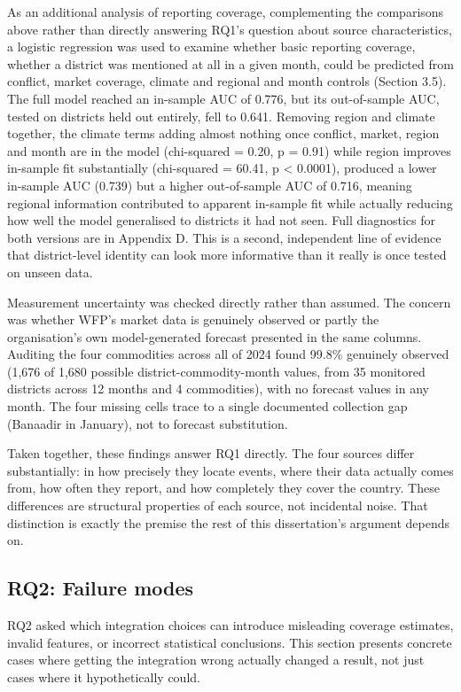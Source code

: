 \documentclass[12pt,a4paper]{article}
\begin{document}
As an additional analysis of reporting coverage, complementing the comparisons above rather than directly answering RQ1's question about source characteristics, a logistic regression was used to examine whether basic reporting coverage, whether a district was mentioned at all in a given month, could be predicted from conflict, market coverage, climate and regional and month controls (Section 3.5). The full model reached an in-sample AUC of 0.776, but its out-of-sample AUC, tested on districts held out entirely, fell to 0.641. Removing region and climate together, the climate terms adding almost nothing once conflict, market, region and month are in the model (chi-squared = 0.20, p = 0.91) while region improves in-sample fit substantially (chi-squared = 60.41, p < 0.0001), produced a lower in-sample AUC (0.739) but a higher out-of-sample AUC of 0.716, meaning regional information contributed to apparent in-sample fit while actually reducing how well the model generalised to districts it had not seen. Full diagnostics for both versions are in Appendix D. This is a second, independent line of evidence that district-level identity can look more informative than it really is once tested on unseen data.

Measurement uncertainty was checked directly rather than assumed. The concern was whether WFP's market data is genuinely observed or partly the organisation's own model-generated forecast presented in the same columns. Auditing the four commodities across all of 2024 found 99.8\% genuinely observed (1,676 of 1,680 possible district-commodity-month values, from 35 monitored districts across 12 months and 4 commodities), with no forecast values in any month. The four missing cells trace to a single documented collection gap (Banaadir in January), not to forecast substitution.

Taken together, these findings answer RQ1 directly. The four sources differ substantially: in how precisely they locate events, where their data actually comes from, how often they report, and how completely they cover the country. These differences are structural properties of each source, not incidental noise. That distinction is exactly the premise the rest of this dissertation's argument depends on.

\subsection{RQ2: Failure modes}

RQ2 asked which integration choices can introduce misleading coverage estimates, invalid features, or incorrect statistical conclusions. This section presents concrete cases where getting the integration wrong actually changed a result, not just cases where it hypothetically could.
\end{document}
